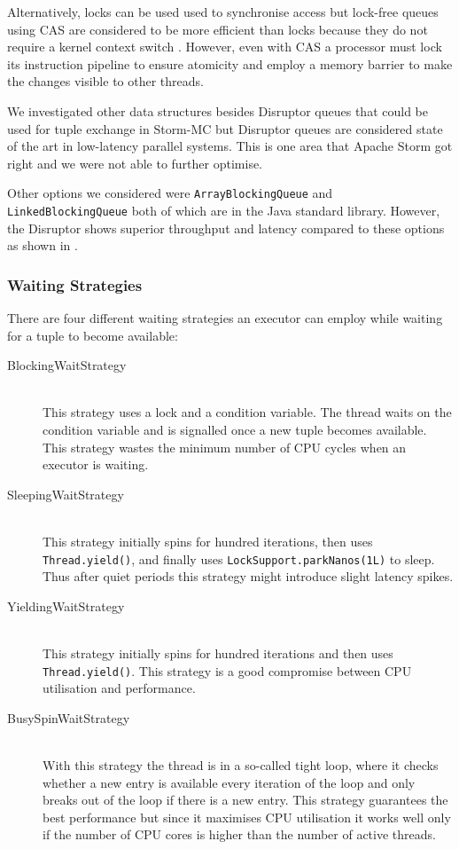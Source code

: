 \documentclass[bsc,twoside,singlespacing,normalheadings,parskip]{infthesis}\usepackage[]{graphicx}\usepackage[]{color}
\begin{document}
Alternatively, locks can be used used to synchronise access but lock-free queues using CAS are considered to be more efficient than locks because they do not require a kernel context switch \cite{Thompson_Farley_Barker_Gee_Stewart_2011}. However, even with CAS a processor must lock its instruction pipeline to ensure atomicity and employ a memory barrier to make the changes visible to other threads.

We investigated other data structures besides Disruptor queues that could be used for tuple exchange in Storm-MC but Disruptor queues are considered state of the art in low-latency parallel systems. This is one area that Apache Storm got right and we were not able to further optimise.

Other options we considered were \texttt{ArrayBlockingQueue} and \texttt{LinkedBlockingQueue} both of which are in the Java standard library. However, the Disruptor shows superior throughput and latency compared to these options as shown in \citep{DisruptorWiki}.

\subsubsection{Waiting Strategies}
\label{subsubsec:waiting}

There are four different waiting strategies an executor can employ while waiting for a tuple to become available:

\begin{description}
	\item[BlockingWaitStrategy] \hfill \\
	This strategy uses a lock and a condition variable. The thread waits on the condition variable and is signalled once a new tuple becomes available. This strategy wastes the minimum number of CPU cycles when an executor is waiting.
	\item[SleepingWaitStrategy] \hfill \\
	This strategy initially spins for hundred iterations, then uses \texttt{Thread.yield()}, and finally uses \texttt{LockSupport.parkNanos(1L)} to sleep. Thus after quiet periods this strategy might introduce slight latency spikes.
	\item[YieldingWaitStrategy] \hfill \\
	This strategy initially spins for hundred iterations and then uses \texttt{Thread.yield()}. This strategy is a good compromise between CPU utilisation and performance.
	\item[BusySpinWaitStrategy] \hfill \\
	With this strategy the thread is in a so-called tight loop, where it checks whether a new entry is available every iteration of the loop and only breaks out of the loop if there is a new entry. This strategy guarantees the best performance but since it maximises CPU utilisation it works well only if the number of CPU cores is higher than the number of active threads.
\end{description}
\end{document}
